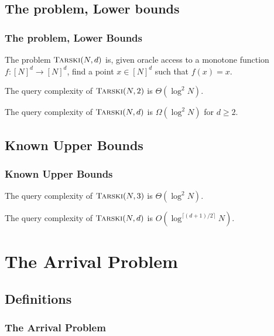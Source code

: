 \documentclass{beamer}
\begin{document}
\subsection{The problem, Lower bounds}

\begin{frame}
\frametitle{The problem, Lower Bounds}
    \begin{Definition}
        The problem $\textsc{Tarski}(N, d)$ is, given oracle access to a monotone function $f : [N]^d \to [N]^d$, find a point $x \in [N]^d$ such that
        $f(x) = x$.
    \end{Definition}
    \begin{Theorem}
        The query complexity of $\textsc{Tarski}(N, 2)$ is $\Theta(\log^2 N)$.
    \end{Theorem}
    \begin{Corollary}
        The query complexity of $\textsc{Tarski}(N, d)$ is $\Omega(\log^2 N)$ for $d \geq 2$.
    \end{Corollary}
\end{frame}


\newcommand{\trsk}{\textsc{Tarski}}

\subsection{Known Upper Bounds}
\begin{frame}
\frametitle{Known Upper Bounds}

\begin{Theorem}
    The query complexity of $\trsk(N, 3)$ is $\Theta(\log^2 N)$.
\end{Theorem}
\begin{Theorem}[Chen, Li, '22]
    The query complexity of $\trsk(N, d)$ is $O(\log^{\lceil (d+1) / 2 \rceil} N)$.
\end{Theorem}

\end{frame}


\section{The Arrival Problem}
\subsection{Definitions}
\begin{frame}
\frametitle{The Arrival Problem}
  \begin{figure}[h]
    \centering
    
  \end{figure}
\end{frame}
\end{document}
